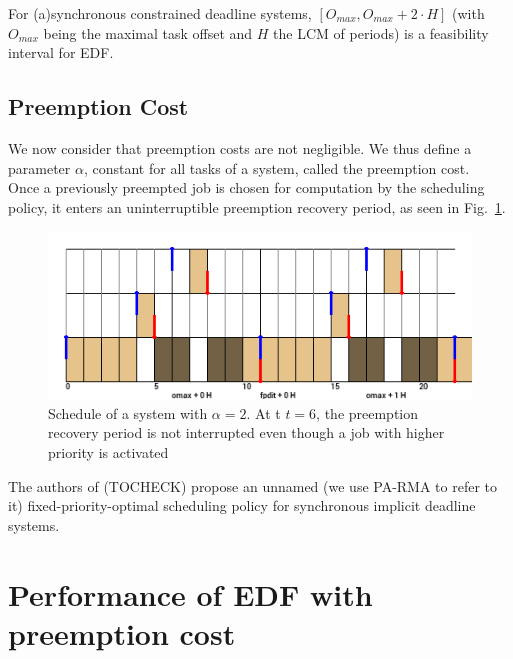 \documentclass[a4paper,10pt]{article}
\begin{document}
        For (a)synchronous constrained deadline systems, $[O_{max}, O_{max} + 2 \cdot H]$ (with $O_{max}$ being the maximal task offset and $H$ the LCM of periods) is a feasibility interval for EDF.

    \subsection{Preemption Cost}

        We now consider that preemption costs are not negligible. We thus define a parameter $\alpha$, constant for all tasks of a system, called the preemption cost.\\

        Once a previously preempted job is chosen for computation by the scheduling policy, it enters an uninterruptible preemption recovery period, as seen in Fig.~\ref{fig:prp}.\\

        \begin{figure}[H]
        \begin{center}
            \includegraphics[width=\textwidth]{figs/atomicpreemption_example.png}
            \caption{Schedule of a system with $\alpha=2$. At t $t=6$, the preemption recovery period is not interrupted even though a job with higher priority is activated}
            \label{fig:prp}
        \end{center}
        \end{figure}

        The authors of \cite{meumeu2007extending} (TOCHECK) propose an unnamed (we use PA-RMA to refer to it) fixed-priority-optimal scheduling policy for synchronous implicit deadline systems.

\section{Performance of EDF with preemption cost}
\end{document}
